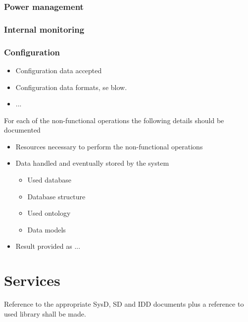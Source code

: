 \documentclass[a4paper]{arrowhead}
\begin{document}
\subsubsection {Power management}
\subsubsection {Internal monitoring}
\subsubsection {Configuration}
  \begin{itemize}
  \item Configuration data accepted
  \item Configuration data formats, se blow.
  \item ...  
  \end{itemize}  

For each of the non-functional operations the following details
should be documented 

\begin{itemize}
  \item Resources necessary to perform the non-functional operations
  \item Data handled and eventually stored by the system
    \begin{itemize}
    \item Used database
    \item Database structure
    \item Used ontology
    \item Data models
    \end{itemize}
  \item Result provided as ...
  \end{itemize}
\color{black}




\newpage

\section{Services}
\label{sec:services}

\color{red}
Reference to the appropriate SysD, SD and IDD documents plus a
reference to used library shall be made.
\end{document}
